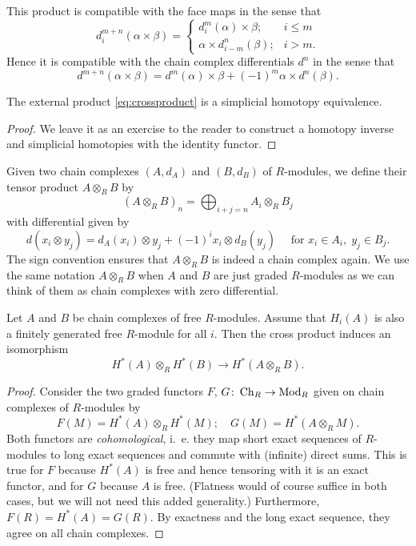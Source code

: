 \documentclass[a4paper,openany]{scrbook}
\begin{document}
This product is compatible with the face maps in the sense that
\[
d^{m+n}_i(\alpha \times \beta) = \begin{cases}
d^m_i(\alpha) \times \beta; & i \leq m\\
\alpha \times d^n_{i-m}(\beta); & i > m.
\end{cases}
\]
Hence it is compatible with the chain complex differentials $d^n$ in the sense that
\[
d^{m+n}(\alpha \times \beta) = d^m(\alpha) \times \beta + (-1)^m \alpha \times d^n(\beta).
\]

\begin{thm}\label{thm:Eilenberg-Zilber}
The external product \eqref{eq:crossproduct} is a simplicial homotopy equivalence.
\end{thm}
\begin{proof}
We leave it as an exercise to the reader to construct a homotopy inverse and simplicial homotopies with the identity functor.
\end{proof}

Given two chain complexes $(A,d_A)$ and $(B,d_B)$ of $R$-modules, we define their tensor product $A \otimes_R B$ by
\[
(A \otimes_R B)_n = \bigoplus_{i+j=n} A_i \otimes_R B_j
\]
with differential given by
\[
d(x_i \otimes y_j) = d_A(x_i) \otimes y_j + (-1)^i x_i \otimes d_B(y_j) \quad \text{ for } x_i \in A_i,\; y_j \in B_j.
\]
The sign convention ensures that $A \otimes_R B$ is indeed a chain complex again. We use the same notation $A \otimes_R B$ when $A$ and $B$ are just graded $R$-modules as we can think of them as chain complexes with zero differential.

\begin{thm}\label{thm:algebraickunnethiso}
Let $A$ and $B$ be chain complexes of free $R$-modules. Assume that $H_i(A)$ is also a finitely generated free $R$-module for all $i$. Then the cross product induces an isomorphism
\[
H^*(A) \otimes_R H^*(B) \to H^*(A \otimes_R B).
\]
\end{thm}
\begin{proof}
Consider the two graded functors $F$, $G\colon \operatorname{Ch}_R \to \operatorname{Mod}_R$ given on chain complexes of $R$-modules by
\[
F(M) = H^*(A) \otimes_R H^*(M); \quad G(M) = H^*(A \otimes_R M).
\]
Both functors are \emph{cohomological}, i.~e. they map short exact sequences of $R$-modules to long exact sequences and commute with (infinite) direct sums. This is true for $F$ because $H^*(A)$ is free and hence tensoring with it is an exact functor, and for $G$ because $A$ is free. (Flatness would of course suffice in both cases, but we will not need this added generality.) Furthermore, $F(R) = H^*(A) = G(R)$. By exactness and the long exact sequence, they agree on all chain complexes.
\end{proof}
\end{document}
